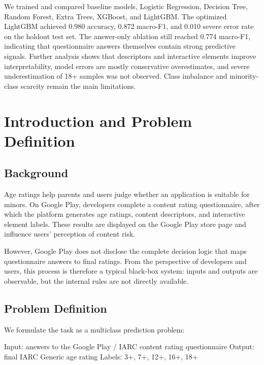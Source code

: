 \documentclass[UTF8,a4paper,12pt]{ctexart}
\newenvironment{Shaded}{\begin{snugshade}}{\end{snugshade}}
\newcommand{\NormalTok}[1]{#1}
\renewenvironment{Shaded}{%
    \vspace{0.35em}%
    \begin{tcolorbox}[enhanced,breakable,colback=zjucodebg,colframe=zjucodeframe,boxrule=0.45pt,leftrule=2.2pt,arc=1.6mm,left=1.8mm,right=1.8mm,top=1.2mm,bottom=1.2mm]%
  }{%
    \end{tcolorbox}%
    \vspace{0.25em}%
  }%
\begin{document}
We trained and compared baseline models, Logistic Regression, Decision Tree, Random Forest, Extra Trees, XGBoost, and LightGBM. The optimized LightGBM achieved 0.980 accuracy, 0.872 macro-F1, and 0.010 severe error rate on the holdout test set. The answer-only ablation still reached 0.774 macro-F1, indicating that questionnaire answers themselves contain strong predictive signals. Further analysis shows that descriptors and interactive elements improve interpretability, model errors are mostly conservative overestimates, and severe underestimation of 18+ samples was not observed. Class imbalance and minority-class scarcity remain the main limitations.

\clearpage

\section{Introduction and Problem Definition}\label{introduction-and-problem-definition}

\subsection{Background}\label{background}

Age ratings help parents and users judge whether an application is suitable for minors. On Google Play, developers complete a content rating questionnaire, after which the platform generates age ratings, content descriptors, and interactive element labels. These results are displayed on the Google Play store page and influence users' perception of content risk.

However, Google Play does not disclose the complete decision logic that maps questionnaire answers to final ratings. From the perspective of developers and users, this process is therefore a typical black-box system: inputs and outputs are observable, but the internal rules are not directly available.

\subsection{Problem Definition}\label{problem-definition}

We formulate the task as a multiclass prediction problem:

\begin{Shaded}
\begin{Highlighting}[]
\NormalTok{Input: answers to the Google Play / IARC content rating questionnaire}
\NormalTok{Output: final IARC Generic age rating}
\NormalTok{Labels: 3+, 7+, 12+, 16+, 18+}
\end{Highlighting}
\end{Shaded}
\end{document}
